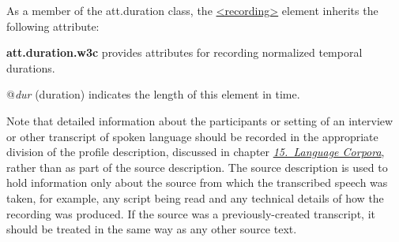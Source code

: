 As a member of the \textsf{att.duration} class, the \hyperref[TEI.recording]{<recording>} element inherits the following attribute: 
\begin{sansreflist}
  
\item [\textbf{att.duration.w3c}] provides attributes for recording normalized temporal durations.\hfil\\[-10pt]\begin{sansreflist}
    \item[@{\itshape dur}]
  (duration) indicates the length of this element in time.
\end{sansreflist}  
\end{sansreflist}
\par
Note that detailed information about the participants or setting of an interview or other transcript of spoken language should be recorded in the appropriate division of the profile description, discussed in chapter \textit{\hyperref[CC]{15.\ Language Corpora}}, rather than as part of the source description. The source description is used to hold information only about the source from which the transcribed speech was taken, for example, any script being read and any technical details of how the recording was produced. If the source was a previously-created transcript, it should be treated in the same way as any other source text.\par
